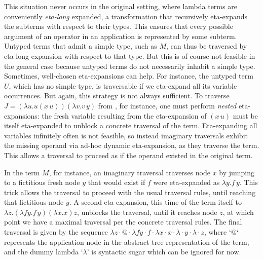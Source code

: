 \documentclass[xchauthor,chkrefs,GCNS,amsmath,amsthm,rotating,leaveRGB]{tcsg}
\theoremstyle{plain}
\theoremstyle{definition}
\begin{document}
This situation never occurs in the original setting, where lambda terms are
conveniently \emph{eta-long} expanded, a transformation that recursively
eta-expands the subterms with respect to their types. This ensures that every
possible argument of an operator in an application is represented by some
subterm. Untyped terms that admit a simple type, such as $M$, can thus be
traversed by eta-long expansion with respect to that type. But this is of
course not feasible in the general case because untyped terms do not
necessarily inhabit a simple type. Sometimes, well-chosen eta-expansions can
help. For instance, the untyped term $U$, which has no simple type, is
traversable if we eta-expand all its variable occurrences. But again, this
strategy is not always sufficient. To traverse $J = (\lambda u . u(x\, u))
(\lambda v . v\, y)$ from , for
instance, one must perform \emph{nested} eta-expansions: the fresh
variable resulting from the eta-expansion of $(x\, u)$ must be itself
eta-expanded to unblock a concrete traversal of the term. Eta-expanding all
variables infinitely often is not feasible, so instead imaginary traversals
exhibit the missing operand via ad-hoc dynamic eta-expansion, as they
traverse the term. This allows a traversal to proceed as if the operand
existed in the original term.

In the term $M$, for instance, an imaginary traversal traverses node $x$ by
jumping to a fictitious fresh node $y$ that would exist if $f$ were
eta-expanded as $\lambda y.f\, y$. This trick allows the traversal to proceed
with the usual traversal rules, until reaching that fictitious node $y$. A
second eta-expansion, this time of the term itself to $\lambda z. (\lambda f
y.f\, y)(\lambda x.x) z$, unblocks the traversal, until it reaches node $z$,
at which point we have a maximal traversal per the concrete traversal rules.
The final traversal is given by the sequence $\lambda z \cdot @ \cdot \lambda
f y \cdot f \cdot \lambda x \cdot x \cdot \lambda \cdot y \cdot \lambda \cdot
z$, where `@` represents the application node in the abstract tree
representation of the term, and the dummy lambda `$\lambda $' is syntactic
sugar which can be ignored for now.
\end{document}
